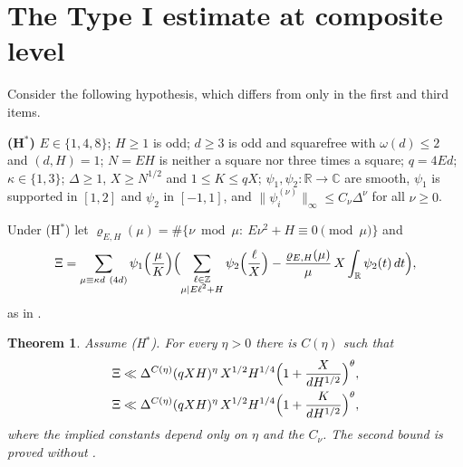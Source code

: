 \documentclass[11pt]{amsart}
\newtheorem{theorem}{Theorem}[section]
\theoremstyle{remark}
\theoremstyle{definition}
\numberwithin{equation}{section}
\newcommand{\Z}{\mathbb{Z}}
\newcommand{\R}{\mathbb{R}}
\newcommand{\C}{\mathbb{C}}
\begin{document}
\section{The Type I estimate at composite level}\label{sec:typeI}

Consider the following hypothesis, which differs from \cite[(H)]{IC} only in the first and third items.

\medskip
\noindent\textbf{(H$^*$)} $E\in\{1,4,8\}$; $H\ge1$ is odd; $d\ge3$ is odd and squarefree with $\omega(d)\le2$ and $(d,H)=1$; $N=EH$ is neither a square nor three times a square; $q=4Ed$; $\kappa\in\{1,3\}$; $\Delta\ge1$, $X\ge N^{1/2}$ and $1\le K\le qX$; $\psi_1,\psi_2:\R\to\C$ are smooth, $\psi_1$ is supported in $[1,2]$ and $\psi_2$ in $[-1,1]$, and $\|\psi_i^{(\nu)}\|_\infty\le C_\nu\Delta^\nu$ for all $\nu\ge0$.
\medskip

Under (H$^*$) let $\varrho_{E,H}(\mu)=\#\{\nu\bmod\mu:\ E\nu^2+H\equiv0\pmod\mu\}$ and
\begin{equation}\label{eq:Xi}
\Xi=\sum_{\mu\equiv\kappa d\ (4d)}\psi_1\Bigl(\frac\mu K\Bigr)\Bigl(\sum_{\substack{\ell\in\Z\\ \mu\mid E\ell^2+H}}\psi_2\Bigl(\frac\ell X\Bigr)-\frac{\varrho_{E,H}(\mu)}{\mu}\,X\int_\R\psi_2(t)\,dt\Bigr),
\end{equation}
as in \cite[(6.1)]{IC}.

\begin{theorem}\label{thm:typeI}
Assume \textup{(H$^*$)}. For every $\eta>0$ there is $C(\eta)$ such that
\begin{align*}
\Xi&\ll\Delta^{C(\eta)}(qXH)^{\eta}\,X^{1/2}H^{1/4}\Bigl(1+\frac{X}{dH^{1/2}}\Bigr)^{\theta},\\
\Xi&\ll\Delta^{C(\eta)}(qXH)^{\eta}\,X^{1/2}H^{1/4}\Bigl(1+\frac{K}{dH^{1/2}}\Bigr)^{\theta},
\end{align*}
where the implied constants depend only on $\eta$ and the $C_\nu$. The second bound is proved without \cite[Theorem~2]{Pas}.
\end{theorem}
\end{document}
